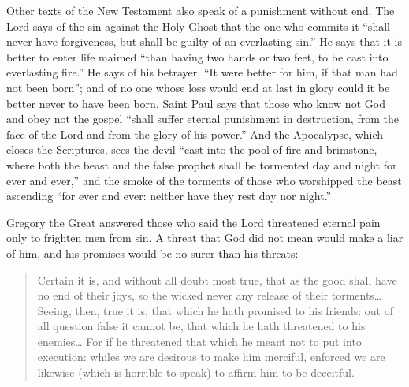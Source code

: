 Other texts of the New Testament also speak of a punishment without end. The Lord says of the sin against the Holy Ghost that the one who commits it ``shall never have forgiveness, but shall be guilty of an everlasting sin.'' He says that it is better to enter life maimed ``than having two hands or two feet, to be cast into everlasting fire.'' He says of his betrayer, ``It were better for him, if that man had not been born''; and of no one whose loss would end at last in glory could it be better never to have been born. Saint Paul says that those who know not God and obey not the gospel ``shall suffer eternal punishment in destruction, from the face of the Lord and from the glory of his power.'' And the Apocalypse, which closes the Scriptures, sees the devil ``cast into the pool of fire and brimstone, where both the beast and the false prophet shall be tormented day and night for ever and ever,'' and the smoke of the torments of those who worshipped the beast ascending ``for ever and ever: neither have they rest day nor night.''

Gregory the Great answered those who said the Lord threatened eternal pain only to frighten men from sin. A threat that God did not mean would make a liar of him, and his promises would be no surer than his threats:

\begin{quote}
Certain it is, and without all doubt most true, that as the good shall have no end of their joys, so the wicked never any release of their torments\ldots{} Seeing, then, true it is, that which he hath promised to his friends: out of all question false it cannot be, that which he hath threatened to his enemies\ldots{} For if he threatened that which he meant not to put into execution: whiles we are desirous to make him merciful, enforced we are likewise (which is horrible to speak) to affirm him to be deceitful.
\end{quote}

